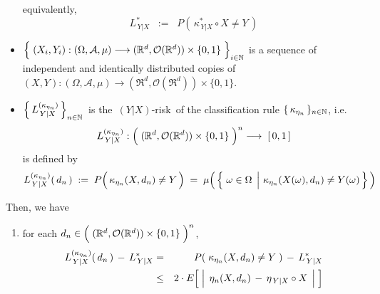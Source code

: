 \begin{theorem}
\begin{itemize}
	equivalently,
	\begin{equation*}
	L^{*}_{\,Y \vert X} \;\; := \;\; P\!\left(\, \kappa^{*}_{\,Y \vert X} \circ X \neq Y \,\right)
	\end{equation*}	
\item
	$\left\{\;
		(X_{i},Y_{i}) : (\Omega,\mathcal{A},\mu)
			\overset{{\color{white}-}}{\longrightarrow}
			(\Re^{d},\mathcal{O}(\Re^{d})) \times \{0,1\}
	\;\right\}_{i\in\N}$\;
	is a sequence of independent and identically distributed copies of
	$(X,Y) : (\Omega,\mathcal{A},\mu) \longrightarrow (\Re^{d},\mathcal{O}(\Re^{d})) \times \{0,1\}$.
\item
	$\left\{\,L^{(\kappa_{\eta_{n}})}_{\,Y \vert X}\,\right\}_{n\in\mathbb{N}}$\,
	is the \,$(Y \vert X)$-risk\, of the classification rule $\{\,\kappa_{\eta_{n}}\,\}_{n\in\mathbb{N}}$, i.e.
	\begin{equation*}
	L^{(\kappa_{\eta_{n}})}_{\,Y \vert X} :
		\left(\;(\Re^{d},\mathcal{O}(\Re^{d})) \overset{{\color{white}.}}{\times} \{0,1\} \;\right)^{n} \longrightarrow\; [\,0,1\,]
	\end{equation*}
	is defined by
	\begin{equation*}
	L^{(\kappa_{\eta_{n}})}_{\,Y \vert X}(\,d_{n}\,)
	\; := \;
		P\!\left(\, \kappa_{\eta_{n}}(X,d_{n}) \overset{{\color{white}.}}{\neq} Y \,\right)
	\; = \;
		\mu\!\left(\,\left\{\,
			\left.\omega\overset{{\color{white}.}}{\in}\Omega\;\,\right\vert\,\kappa_{\eta_{n}}(X(\omega),d_{n}) \neq Y(\omega)
			\,\right\}\,\right)
	\end{equation*}
\end{itemize}
Then, we have
\begin{enumerate}
\item
	for each
	\;$d_{n} \in \left(\;(\Re^{d},\mathcal{O}(\Re^{d})) \overset{{\color{white}.}}{\times} \{0,1\} \;\right)^{n}$,
	\begin{eqnarray*}
	L^{(\kappa_{\eta_{n}})}_{\,Y \vert X}(\,d_{n}\,) \, - \, L^{*}_{\,Y \vert X}
	& = &
		P\!\left(\;\kappa_{\eta_{n}}(X,d_{n}) \neq Y \;\right) \,-\, L^{*}_{\,Y \vert X}
	\\
	& \leq &
		2 \cdot E\!\left[\;
			\left\vert\;\, \eta_{n}(X,d_{n}) \,\overset{{\color{white}.}}{-}\, \eta_{\,Y\vert X} \circ X \;\,\right\vert
			\;\right]
	\\

\end{eqnarray*}
\end{enumerate}
\end{theorem}
